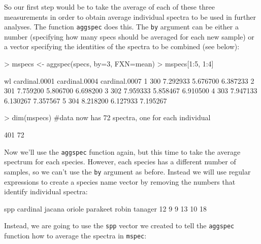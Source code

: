 \documentclass{article}
\newcommand{\code}[1]{{\tt #1}}  %
\begin{document}
\clearpage{}

So our first step would be to take the average of each of these three measurements in order to 
obtain average individual spectra to be used in further analyses. The function \code{aggspec} 
does this. The \code{by} argument can be either a number (specifying how many specs should be 
averaged for each new sample) or a vector specifying the identities of the spectra to be 
combined (see below):

\begin{Schunk}
\begin{Sinput}
> mspecs <- aggspec(specs, by=3, FXN=mean)
> mspecs[1:5, 1:4]
\end{Sinput}
\begin{Soutput}
   wl cardinal.0001 cardinal.0004 cardinal.0007
1 300      7.292933      5.676700      6.387233
2 301      7.759200      5.806700      6.698200
3 302      7.959333      5.858467      6.910500
4 303      7.947133      6.130267      7.357567
5 304      8.218200      6.127933      7.195267
\end{Soutput}
\begin{Sinput}
> dim(mspecs) #data now has 72 spectra, one for each individual
\end{Sinput}
\begin{Soutput}
[1] 401  72
\end{Soutput}
\end{Schunk}

Now we'll use the \code{aggspec} function again, but this time to take the average spectrum for 
each species. However, each species has a different number of samples, so we can't use the 
\code{by} argument as before. Instead we will use regular expressions to create a species name 
vector by removing the numbers that identify individual spectra:

\begin{Schunk}
\begin{Soutput}
spp
cardinal   jacana   oriole parakeet    robin  tanager 
      12        9        9       13       10       18 
\end{Soutput}
\end{Schunk}

Instead, we are going to use the \code{spp} vector we created to tell the \code{aggspec} 
function how to average the spectra in \code{mspec}:
\end{document}

